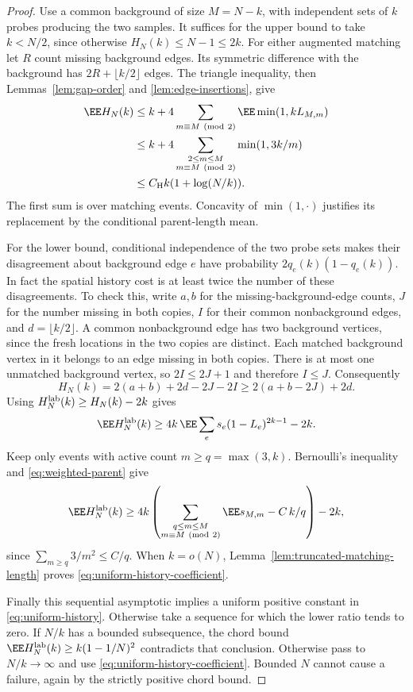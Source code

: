 \documentclass[11pt,letterpaper]{article}
\begin{document}
\begin{proof}
Use a common background of size $M=N-k$, with independent sets of
$k$ probes producing the two samples. It suffices for the upper
bound to take $k<N/2$, since otherwise $H_N(k)\le N-1\le2k$.
For either augmented matching let $R$ count missing background edges.
Its symmetric difference with the background has
$2R+\lfloor k/2\rfloor$ edges. The triangle inequality, then
Lemmas~\ref{lem:gap-order} and \ref{lem:edge-insertions}, give
\begin{align*}
 \EE H_N(k)
 &\le k+4\sum_{m\equiv M\ ({\rm mod}\ 2)}\EE\min(1,kL_{M,m})\\
 &\le k+4\sum_{\substack{2\le m\le M\\m\equiv M\ ({\rm mod}\ 2)}}
                                      \min(1,3k/m)\\
 &\le C_{\rm H}k(1+\log(N/k)).
\end{align*}
The first sum is over matching events. Concavity of $\min(1,\cdot)$
justifies its replacement by the conditional parent-length mean.

For the lower bound, conditional independence of the two probe
sets makes their disagreement about background edge $e$ have
probability $2q_e(k)(1-q_e(k))$. In fact the spatial history cost
is at least twice the number of these disagreements. To check this,
write $a,b$ for the missing-background-edge counts, $J$ for the
number missing in both copies, $I$ for their common nonbackground
edges, and $d=\lfloor k/2\rfloor$. A common nonbackground edge
has two background vertices, since the fresh locations in the two
copies are distinct. Each matched background vertex in it belongs
to an edge missing in both copies. There is at most one unmatched
background vertex, so $2I\le2J+1$ and therefore $I\le J$.
Consequently
\[
 H_N(k)=2(a+b)+2d-2J-2I
       \ge2(a+b-2J)+2d.
\]
Using $H_N^{\rm lab}(k)\ge H_N(k)-2k$ gives
\[
 \EE H_N^{\rm lab}(k)
 \ge4k\,\EE\sum_e s_e(1-L_e)^{2k-1}-2k.
\]
Keep only events with active count $m\ge q=\max(3,k)$.
Bernoulli's inequality and \eqref{eq:weighted-parent} give
\begin{equation}\label{eq:history-truncated-lower}
 \EE H_N^{\rm lab}(k)\ge
 4k\left(
 \sum_{\substack{q\le m\le M\\m\equiv M\ ({\rm mod}\ 2)}}\EE s_{M,m}
       -C\,k/q\right)-2k,
\end{equation}
since $\sum_{m\ge q}3/m^2\le C/q$.
When $k=o(N)$, Lemma~\ref{lem:truncated-matching-length} proves
\eqref{eq:uniform-history-coefficient}.

Finally this sequential asymptotic implies a uniform positive
constant in \eqref{eq:uniform-history}. Otherwise take a sequence
for which the lower ratio tends to zero. If $N/k$ has a bounded
subsequence, the chord bound
$\EE H_N^{\rm lab}(k)\ge k(1-1/N)^2$ contradicts that conclusion.
Otherwise pass to $N/k\to\infty$ and use
\eqref{eq:uniform-history-coefficient}. Bounded $N$ cannot cause
a failure, again by the strictly positive chord bound.
\end{proof}
\end{document}
